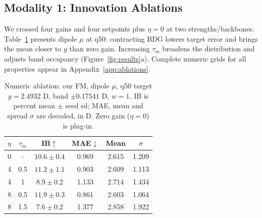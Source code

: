 \documentclass{article}
\begin{document}
\subsection{Modality 1: Innovation Ablations}\label{sec:ablations}
We crossed four gains and four setpoints plus $\eta=0$ at two strengths/backbones. Table~\ref{tab:ablation} presents dipole $\mu$ at q50: contracting BDG lowers target error and brings the mean closer to $y$ than zero gain. Increasing $\tau_m$ broadens the distribution and adjusts band occupancy (Figure~\ref{fig:results}a). Complete numeric grids for all properties appear in Appendix~\ref{app:ablations}.
\begin{table}[!htbp]
\centering\small
\caption{Numeric ablation: our FM, dipole $\mu$, q50 target $y=2.4932$ D, band $\pm0.17541$ D, $w=1$. IB is percent mean $\pm$ seed sd; MAE, mean and spread $\sigma$ are decoded, in D. Zero gain ($\eta=0$) is plug-in.}
\label{tab:ablation}
\begin{tabular}{cccccc}
\toprule
$\eta$ & $\tau_m$ & IB$\uparrow$ & MAE$\downarrow$ & Mean & $\sigma$\\
\midrule
0 & -- & $10.6\pm0.4$ & 0.969 & 2.615 & 1.209\\
4 & 0.5 & $11.2\pm1.1$ & 0.903 & 2.609 & 1.113\\
4 & 1 & $8.9\pm0.2$ & 1.133 & 2.714 & 1.434\\
8 & 0.5 & $11.9\pm0.3$ & 0.861 & 2.603 & 1.064\\
8 & 1.5 & $7.6\pm0.2$ & 1.377 & 2.858 & 1.922\\
\bottomrule
\end{tabular}
\end{table}
\end{document}
